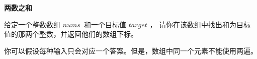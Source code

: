 \textbf{两数之和}\par

给定一个整数数组 $ nums $ 和一个目标值 $ target $ ，
请你在该数组中找出和为目标值的那两个整数，并返回他们的数组下标。\par

你可以假设每种输入只会对应一个答案。但是，数组中同一个元素不能使用两遍。\par
